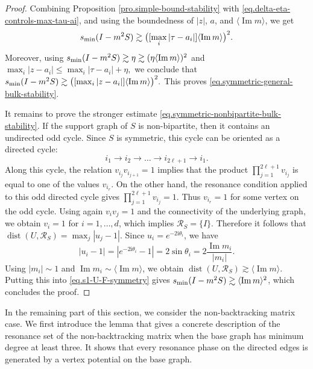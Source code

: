 \documentclass[11pt,twoside, a4paper]{article}
\numberwithin{equation}{section}
\numberwithin{figure}{section}
\theoremstyle{plain} %
\theoremstyle{definition}
\theoremstyle{remark}
\newcommand{\1} {\mspace{1 mu}}
\newcommand{\2} {\mspace{2 mu}}
\DeclareMathOperator{\im}{Im}
\DeclareMathOperator{\dist}{dist}
\begin{document}
\begin{proof}
    Combining Proposition \ref{pro.simple-bound-stability} with
    \eqref{eq.delta-eta-controls-max-tau-ai}, and using the boundedness of
    \(|z|\), \(a\), and \(\langle\im m\rangle\), we get
    \[
        s_{\rm min}(I-m^2S)
        \gtrsim
        \bigl(
            [\max_i|\tau-a_i|]\langle\im m\rangle
        \bigr)^2 .
    \]
    Moreover, using
    $
        s_{\rm min}(I-m^2S)
        \gtrsim
        \eta
        \gtrsim
        (\eta\langle\im m\rangle)^2 
    $
    and 
    $
        \max_i |z-a_i|
        \le
        \max_i|\tau-a_i|+\eta,
    $
    we conclude that
    $
        s_{\rm min}(I-m^2S)
        \gtrsim
        \bigl(
            [\max_i|z-a_i|]\langle\im m\rangle
        \bigr)^2 .
    $
    This proves \eqref{eq.symmetric-general-bulk-stability}.
    
    It remains to prove the stronger estimate \eqref{eq.symmetric-nonbipartite-bulk-stability}.
    If the support graph of \(S\) is non-bipartite, then it contains an undirected odd cycle. Since \(S\) is symmetric, this cycle can be oriented as a directed cycle:
        \[
            i_1\to i_2\to\dots\to i_{2\ell+1}\to i_1.
        \]
        Along this cycle, the relation \(v_{i_j} v_{i_{j+1}}=1\) implies that the product $\prod_{j=1}^{2\ell+1}v_{i_j}$
        is equal to one of the values \(v_{i_r}\). On the other hand, the resonance condition applied
        to this odd directed cycle gives
        $
            \prod_{j=1}^{2\ell+1}v_{i_j}=1.
        $
        Thus \(v_{i_r}=1\) for some vertex on the odd cycle. Using again \(v_i v_j=1\) and the
        connectivity of the underlying graph, we obtain
        $
            v_i=1
        $
        for $i=1,\dots,d$,
        which implies $\mathscr R_{S}=\{I\}.$
        Therefore it follows that
        $
        \dist(U,\mathscr{R}_{S})
        =
        \max_j |u_j-1|.
      $
    Since \(u_i=e^{-2\mathrm i\theta_i}\), we have
    \[
        |u_i-1|
        =
        |e^{-2\mathrm i\theta_i}-1|
        =
        2\sin\theta_i
        =
        2\frac{\im m_i}{|m_i|}.
    \]
    Using $|m_i|\sim 1$ and $\im m_i\sim\langle \im m\rangle$, we obtain
    $
        \dist(U,\mathscr{R}_{S})
        \gtrsim
        \langle\im m\rangle .
    $
    Putting this into \eqref{eq.s1-U-F-symmetry} gives
    $
        s_{\rm min}(I-m^2S)
        \gtrsim
        \langle\im m\rangle^2
    $, which concludes the proof.
     \end{proof}



    In the remaining part of this section, we consider the non-backtracking matrix case.
    We first introduce the lemma that gives a concrete description of the resonance set of the non-backtracking matrix when the base graph has minimum degree at least three. It shows that every resonance phase on the directed edges is generated by a vertex potential on the base graph.
\end{document}
